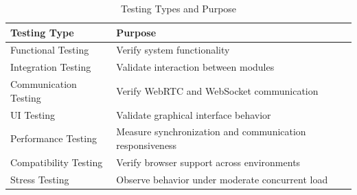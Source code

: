 \documentclass[12pt]{article}
\begin{document}
\begin{table}[h!]
\centering
\renewcommand{\arraystretch}{1.5}


\caption{Functional Feature Comparison}
\end{table}

\begin{table}[h!]
\centering
\renewcommand{\arraystretch}{1.5}

\begin{tabular}{|p{6cm}|p{8cm}|}
\hline
\textbf{Testing Type} & \textbf{Purpose} \\ 
\hline

Functional Testing & Verify system functionality \\ 
\hline

Integration Testing & Validate interaction between modules \\ 
\hline

Communication Testing & Verify WebRTC and WebSocket communication \\ 
\hline

UI Testing & Validate graphical interface behavior \\ 
\hline

Performance Testing & Measure synchronization and communication responsiveness \\ 
\hline

Compatibility Testing & Verify browser support across environments \\ 
\hline

Stress Testing & Observe behavior under moderate concurrent load \\ 
\hline

\end{tabular}
\caption{Testing Types and Purpose}

\end{table}
\end{document}
